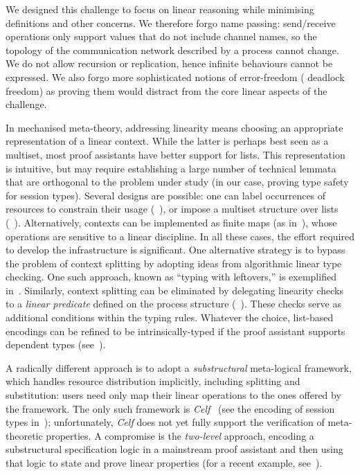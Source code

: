 \documentclass[runningheads]{llncs}
\begin{document}
We designed this challenge to focus on linear reasoning while minimising
definitions and other concerns.  We therefore forgo name passing:
send/receive operations only support values that do not include channel names, so
the topology of the communication network described by a process cannot change.
We do not allow recursion or replication, hence infinite behaviours cannot be
expressed. We also forgo more sophisticated notions of error-freedom (\eg
deadlock freedom) as proving them would distract from the core linear
aspects of the challenge.

In mechanised meta-theory, addressing linearity means choosing an appropriate
representation of a linear context.  While the latter  is perhaps
best seen as a multiset, most proof assistants have better support for lists.
This representation is intuitive, but may require
establishing a large number of technical lemmata that are orthogonal to the
problem under study (in our case, proving type safety for session types).
Several designs are possible: one can label
occurrences of resources to constrain their usage (\eg~\cite{CicconeP20}), or impose a multiset structure over lists
(\eg~\cite{Danielsson12,ChaudhuriLR19}). Alternatively, contexts can be
implemented as finite maps (as in~\cite{Castro2020}), whose operations are
sensitive to a linear discipline. In all these cases, the effort required to
develop the infrastructure is significant.
One alternative strategy is to bypass the problem of context splitting
by adopting ideas from algorithmic linear type checking. One such
approach, known as ``typing with leftovers,'' is exemplified
in~\cite{DBLP:conf/forte/ZalakainD21}.
Similarly, context splitting can be eliminated by delegating linearity checks to a
\emph{linear predicate} defined on the process structure (\eg~\cite{BP23}).
These checks serve as additional conditions within the typing rules.
Whatever the choice, list-based encodings can be refined to be intrinsically-typed if the
proof assistant supports dependent types
(see~\cite{Thiemann2019,CicconeP20,RouvoetPKV20}).

A radically different approach is to adopt a \emph{substructural}
meta-logical framework, which handles resource
distribution implicitly, including splitting and
substitution: users need only map their linear operations to the
ones offered by the framework.  The only such framework is
\emph{Celf}~\cite{Schack-Nielsen:IJCAR08} (see the encoding of session
types in~\cite{Bock2016}); unfortunately, \emph{Celf} does not yet
fully support the verification of meta-theoretic properties.  A
compromise is the \emph{two-level} approach, \ie encoding a
substructural specification logic in a mainstream proof assistant and
then using that logic to state and prove linear properties (for a
recent example, see~\cite{Felty:MSCS21}).
\end{document}
